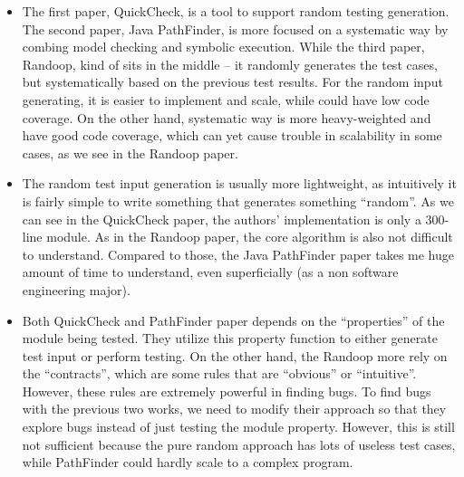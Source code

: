 \documentclass[12pt]{article}
\begin{document}
\begin{itemize}
	\item The first paper, QuickCheck, is a tool to support random testing generation. The second paper, Java PathFinder, is more focused on a systematic way by combing model checking and symbolic execution. While the third paper, Randoop, kind of sits in the middle -- it randomly generates the test cases, but systematically based on the previous test results. For the random input generating, it is easier to implement and scale, while could have low code coverage. On the other hand, systematic way is more heavy-weighted and have good code coverage, which can yet cause trouble in scalability in some cases, as we see in the Randoop paper.
	\item The random test input generation is usually more lightweight, as intuitively it is fairly simple to write something that generates something ``random''. As we can see in the QuickCheck paper, the authors' implementation is only a 300-line module. As in the Randoop paper, the core algorithm is also not difficult to understand. Compared to those, the Java PathFinder paper takes me huge amount of time to understand, even superficially (as a non software engineering major).
	\item Both QuickCheck and PathFinder paper depends on the ``properties'' of the module being tested. They utilize this property function to either generate test input or perform testing. On the other hand, the Randoop more rely on the ``contracts'', which are some rules that are ``obvious'' or ``intuitive''. However, these rules are extremely powerful in finding bugs. To find bugs with the previous two works, we need to modify their approach so that they explore bugs instead of just testing the module property. However, this is still not sufficient because the pure random approach has lots of useless test cases, while PathFinder could hardly scale to a complex program.
\end{itemize}

\newpage



\end{document}
